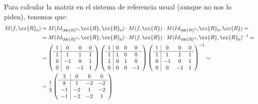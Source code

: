 \begin{ejercicio}
    Para calcular la matriz en el sistema de referencia usual (aunque no nos lo piden), tenemos que:
    \begin{equation*}
        \begin{split}
            M(f, \cc{R}_0) &= M(Id_{\bb{R}^3}, \cc{R}, \cc{R}_0) \cdot M(f, \cc{R}) \cdot M(Id_{\bb{R}^3}, \cc{R}_0, \cc{R}) =\\
            &= M(Id_{\bb{R}^3}, \cc{R}, \cc{R}_0) \cdot M(f, \cc{R}) \cdot M(Id_{\bb{R}^3}, \cc{R}, \cc{R}_0)^{-1} =\\
            &=\left(
            \begin{array}{c|ccc}
                1 & 0 & 0 & 0 \\ \hline
                1 & 1 & 1 & 1 \\
                0 & -1 & 0 & 1 \\
                0 & 0 & -1 & 1
            \end{array}
            \right)
            \left(
            \begin{array}{c|ccc}
                1 & 0 & 0 & 0 \\ \hline
                1 & 1 & 0 & 0 \\
                1 & 0 & 1 & 0 \\
                0 & 0 & 0 & -1
            \end{array}
            \right)\left(
            \begin{array}{c|ccc}
                1 & 0 & 0 & 0 \\ \hline
                1 & 1 & 1 & 1 \\
                0 & -1 & 0 & 1 \\
                0 & 0 & -1 & 1
            \end{array}
            \right)^{-1}
            =\\
            &= \frac{1}{3} \left(
            \begin{array}{c|ccc}
                3 & 0 & 0 & 0 \\ \hline
                8 & 1 & -2 & -2 \\
                -1 & -2 & 1 & -2 \\
                -1 & -2 & -2 & 1
            \end{array}
            \right)
        \end{split}
    \end{equation*}
\end{ejercicio}

